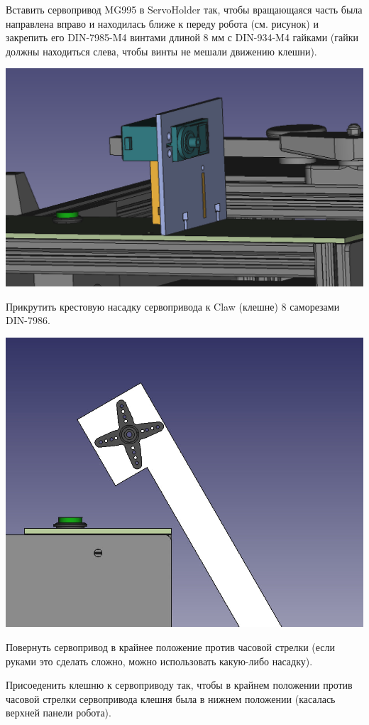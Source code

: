 \documentclass[12pt,a4paper,oneside]{article}
\begin{document}
Вставить сервопривод MG995 в ServoHolder так, чтобы вращающаяся часть была
направлена вправо и находилась ближе к переду робота (см. рисунок) и закрепить
его DIN-7985-M4 винтами длиной 8 мм с DIN-934-M4 гайками (гайки должны
находиться слева, чтобы винты не мешали движению клешни).

\includegraphics[width=\textwidth]{installedservo}

Прикрутить крестовую насадку сервопривода к Claw (клешне) 8 саморезами DIN-7986.

\includegraphics[width=\textwidth]{servo.png}

Повернуть сервопривод в крайнее положение против часовой стрелки (если руками
это сделать сложно, можно использовать какую-либо насадку).

Присоеденить клешню к сервоприводу так, чтобы в крайнем положении против часовой
стрелки сервопривода клешня была в нижнем положении (касалась верхней панели
робота).
\end{document}
